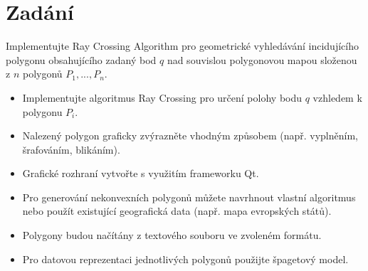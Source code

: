 \section{Zadání}

Implementujte Ray Crossing Algorithm pro geometrické vyhledávání incidujícího polygonu obsahujícího zadaný bod $q$ nad souvislou polygonovou mapou složenou z $n$ polygonů ${P_1, ..., P_n}$.

\begin{itemize}
\item Implementujte algoritmus Ray Crossing pro určení polohy bodu $q$ vzhledem k polygonu $P_i$.
\item Nalezený polygon graficky zvýrazněte vhodným způsobem (např. vyplněním, šrafováním, blikáním).
\item Grafické rozhraní vytvořte s využitím frameworku Qt.
\item Pro generování nekonvexních polygonů můžete navrhnout vlastní algoritmus nebo použít existující geografická data (např. mapa evropských států).
\item Polygony budou načítány z textového souboru ve zvoleném formátu.
\item Pro datovou reprezentaci jednotlivých polygonů použijte špagetový model.
\end{itemize}
